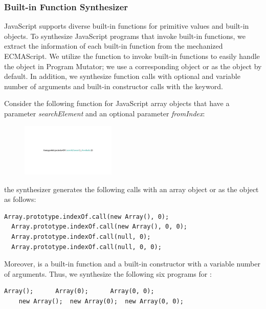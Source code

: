 \subsubsection{Built-in Function Synthesizer}

JavaScript supports diverse built-in functions for primitive values and built-in objects.
To synthesize JavaScript programs that invoke built-in functions,
we extract the information of each built-in function from the mechanized ECMAScript.
We utilize the  function to invoke
built-in functions to easily handle the  object in \textsf{Program Mutator};
we use a corresponding object or  as the  object by default.
In addition, we synthesize function calls with optional and variable number of arguments
and built-in constructor calls with the  keyword.

Consider the following  function for
JavaScript array objects that have a parameter \textit{searchElement}
and an optional parameter \textit{fromIndex}:

\vspace*{-.5em}
\begin{figure}[H]
  \centering
  \includegraphics[width=0.4\textwidth]{img/array-indexof.pdf}
\end{figure}
\vspace*{-.5em}

\noindent
the synthesizer generates the following calls with an array object or  as the 
object as follows:
\begin{lstlisting}[style=myJSstyle]
  Array.prototype.indexOf.call(new Array(), 0);
  Array.prototype.indexOf.call(new Array(), 0, 0);
  Array.prototype.indexOf.call(null, 0);
  Array.prototype.indexOf.call(null, 0, 0);
\end{lstlisting}
Moreover,  is a built-in function and
a built-in constructor with a variable number of arguments.
Thus, we synthesize the following six programs for :
\begin{lstlisting}[style=myJSstyle]
    Array();      Array(0);      Array(0, 0);
    new Array();  new Array(0);  new Array(0, 0);
\end{lstlisting}
